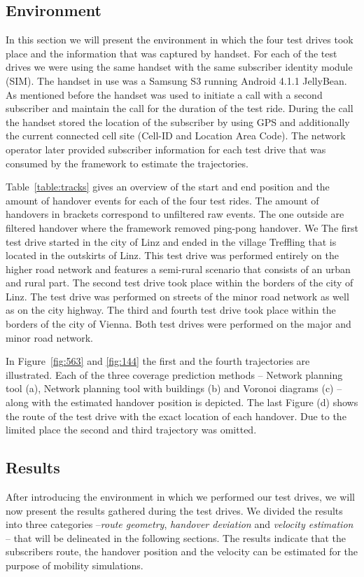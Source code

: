 \documentclass[twocolumn]{bmcart}%
\begin{document}
\subsection*{Environment}
In this section we will present the environment in which the four test drives took place and the information that was captured by handset. For each of the test drives we were using the same handset with the same subscriber identity module (SIM). The handset in use was a Samsung S3 running Android 4.1.1 JellyBean. As mentioned before the handset was used to initiate a call with a second subscriber and maintain the call for the duration of the test ride. During the call the handset stored the location of the subscriber by using GPS and additionally the current connected cell site (Cell-ID and Location Area Code). The network operator later provided subscriber information for each test drive that was consumed by the framework to estimate the trajectories.

Table~\ref{table:tracks} gives an overview of the start and end position and the amount of handover events for each of the four test rides. The amount of handovers in brackets correspond to unfiltered raw events. The one outside are filtered handover where the framework removed ping-pong handover. We  The first test drive started in the city of Linz and ended in the village Treffling that is located in the outskirts of Linz. This test drive was performed entirely on the higher road network and features a semi-rural scenario that consists of an urban and rural part. The second test drive took place within the borders of the city of Linz. The test drive was performed on streets of the minor road network as well as on the city highway. The third and fourth test drive took place within the borders of the city of Vienna. Both test drives were performed on the major and minor road network.

In Figure~\ref{fig:563} and \ref{fig:144} the first and the fourth trajectories are illustrated. Each of the three coverage prediction methods -- Network planning tool (a), Network planning tool with buildings (b) and Voronoi diagrams (c) -- along with the estimated handover position is depicted. The last Figure (d) shows the route of the test drive with the exact location of each handover. Due to the limited place the second and third trajectory was omitted.


\subsection*{Results}
After introducing the environment in which we performed our test drives, we will now present the results gathered during the test drives. We divided the results into three categories --\emph{route geometry}, \emph{handover deviation} and \emph{velocity estimation} -- that will be delineated in the following sections. The results indicate that the subscribers route, the handover position and the velocity can be estimated for the purpose of mobility simulations.
\end{document}
